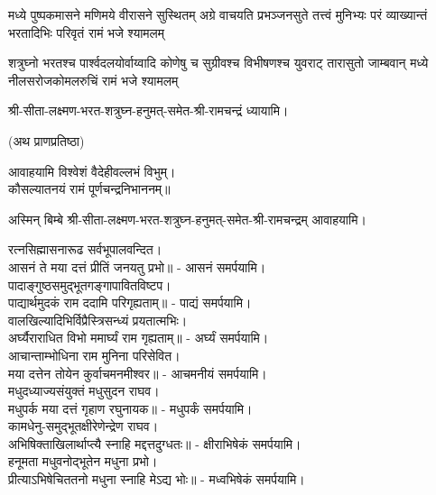 
{मध्ये पुष्पकमासने मणिमये वीरासने सुस्थितम्}
{अग्रे वाचयति प्रभञ्जनसुते तत्त्वं मुनिभ्यः परं}
{व्याख्यान्तं भरतादिभिः परिवृतं रामं भजे श्यामलम्}

{शत्रुघ्नो भरतश्च पार्श्वदलयोर्वाय्वादि कोणेषु च}
{सुग्रीवश्च विभीषणश्च युवराट् तारासुतो जाम्बवान्}
{मध्ये नीलसरोजकोमलरुचिं रामं भजे श्यामलम्}

श्री-सीता-लक्ष्मण-भरत-शत्रुघ्न-हनुमत्-समेत-श्री-रामचन्द्रं ध्यायामि।

(अथ प्राणप्रतिष्ठा)


आवाहयामि विश्वेशं वैदेहीवल्लभं विभुम्।\\
कौसल्यातनयं रामं पूर्णचन्द्रनिभाननम्॥

अस्मिन् बिम्बे श्री-सीता-लक्ष्मण-भरत-शत्रुघ्न-हनुमत्-समेत-श्री-रामचन्द्रम् आवाहयामि।

रत्नसिह्मासनारूढ सर्वभूपालवन्दित।\\
आसनं ते मया दत्तं प्रीतिं जनयतु प्रभो॥ - आसनं समर्पयामि।\\

पादाङ्गुष्ठसमुद्भूतगङ्गापावितविष्टप।\\
पाद्यार्थमुदकं राम ददामि परिगृह्यताम्॥ - पाद्यं समर्पयामि।\\

वालखिल्यादिभिर्विप्रैस्त्रिसन्ध्यं प्रयतात्मभिः।\\
अर्घ्यैराराधित विभो ममार्घ्यं राम गृह्यताम्॥ - अर्घ्यं समर्पयामि।\\

आचान्ताम्भोधिना राम मुनिना परिसेवित।\\
मया दत्तेन तोयेन कुर्वाचमनमीश्वर॥ - आचमनीयं समर्पयामि।\\

मधुदध्याज्यसंयुक्तं मधुसुदन राघव।\\
मधुपर्क मया दत्तं गृहाण रघुनायक॥ - मधुपर्कं समर्पयामि।\\

कामधेनु-समुद्भूतक्षीरेणेन्द्रेण राघव।\\
अभिषिक्ताखिलार्थाप्त्यै स्नाहि मद्दत्तदुग्धतः॥ - क्षीराभिषेकं समर्पयामि।\\

हनूमता मधुवनोद्भूतेन मधुना प्रभो।\\
प्रीत्याऽभिषेचिततनो मधुना स्नाहि मेऽद्य भोः॥ - मध्वभिषेकं समर्पयामि।\\

